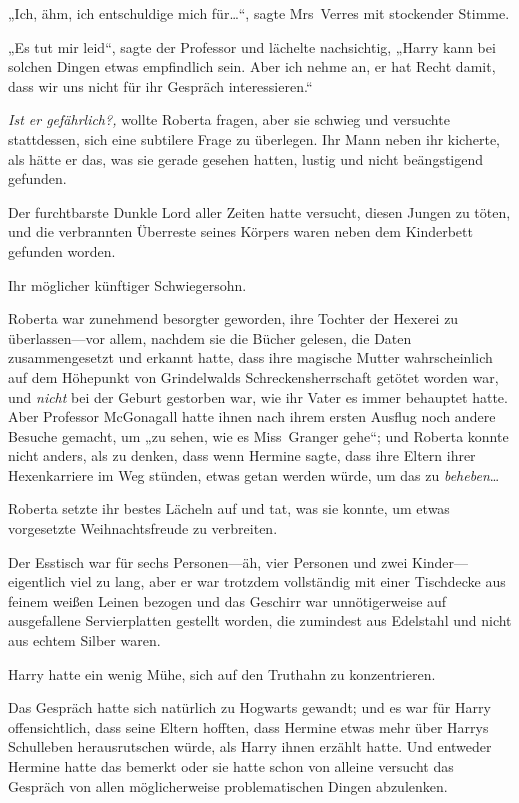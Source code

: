 {„Ich, ähm, ich entschuldige mich für…“, sagte Mrs~Verres mit stockender Stimme.

„Es tut mir leid“, sagte der Professor und lächelte nachsichtig, „Harry kann bei solchen Dingen etwas empfindlich sein. Aber ich nehme an, er hat Recht damit, dass wir uns nicht für ihr Gespräch interessieren.“

\emph{Ist er gefährlich?,} wollte Roberta fragen, aber sie schwieg und versuchte stattdessen, sich eine subtilere Frage zu überlegen. Ihr Mann neben ihr kicherte, als hätte er das, was sie gerade gesehen hatten, lustig und nicht beängstigend gefunden.

Der furchtbarste Dunkle Lord aller Zeiten hatte versucht, diesen Jungen zu töten, und die verbrannten Überreste seines Körpers waren neben dem Kinderbett gefunden worden.

Ihr möglicher künftiger Schwiegersohn.

Roberta war zunehmend besorgter geworden, ihre Tochter der Hexerei zu überlassen—vor allem, nachdem sie die Bücher gelesen, die Daten zusammengesetzt und erkannt hatte, dass ihre magische Mutter wahrscheinlich auf dem Höhepunkt von Grindelwalds Schreckensherrschaft getötet worden war, und \emph{nicht} bei der Geburt gestorben war, wie ihr Vater es immer behauptet hatte. Aber Professor McGonagall hatte ihnen nach ihrem ersten Ausflug noch andere Besuche gemacht, um „zu sehen, wie es Miss~Granger gehe“; und Roberta konnte nicht anders, als zu denken, dass wenn Hermine sagte, dass ihre Eltern ihrer Hexenkarriere im Weg stünden, etwas getan werden würde, um das zu \emph{beheben}…

Roberta setzte ihr bestes Lächeln auf und tat, was sie konnte, um etwas vorgesetzte Weihnachtsfreude zu verbreiten.

Der Esstisch war für sechs Personen—äh, vier Personen und zwei Kinder—eigentlich viel zu lang, aber er war trotzdem vollständig mit einer Tischdecke aus feinem weißen Leinen bezogen und das Geschirr war unnötigerweise auf ausgefallene Servierplatten gestellt worden, die zumindest aus Edelstahl und nicht aus echtem Silber waren.

Harry hatte ein wenig Mühe, sich auf den Truthahn zu konzentrieren.

Das Gespräch hatte sich natürlich zu Hogwarts gewandt; und es war für Harry offensichtlich, dass seine Eltern hofften, dass Hermine etwas mehr über Harrys Schulleben herausrutschen würde, als Harry ihnen erzählt hatte. Und entweder Hermine hatte das bemerkt oder sie hatte schon von alleine versucht das Gespräch von allen möglicherweise problematischen Dingen abzulenken.

}
